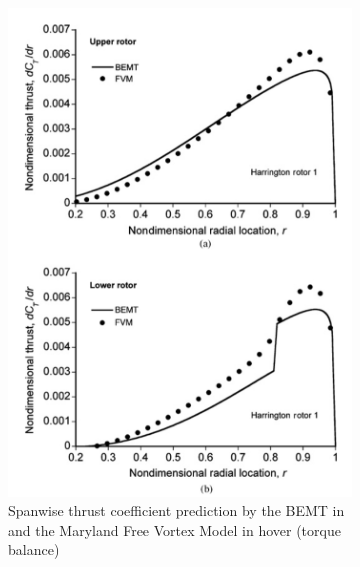 \begin{figure}[H]
\captionsetup[subfigure]{justification=centering}
\begin{subfigure}[t]{0.5\textwidth}
    \centering
    \includegraphics[width=\textwidth]{Figures/Leishman_CT.png}
    \caption{Spanwise thrust coefficient prediction by the BEMT in \cite{BEMT} and the Maryland Free Vortex Model in hover (torque balance)}
    \label{fig:blade2d}
\end{subfigure}
\begin{subfigure}[t]{0.5\textwidth}
    \centering

\end{subfigure}
\end{figure}
